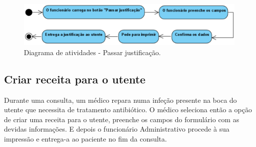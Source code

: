 \documentclass[11pt,a4paper,twoside]{report}
\begin{document}
\begin{figure}[H]
	\centering
	\includegraphics[width=0.7\linewidth]{image/Atividades/Justificação}
	\caption {Diagrama de atividades - Passar justificação.}
	\label{fig:passarjustificacao}
\end{figure}


\subsection{Criar receita para o utente }

Durante uma consulta, um médico repara numa infeção presente na boca do utente que necessita de tratamento antibiótico. O médico seleciona então a opção de criar uma receita para o utente, preenche os campos do formulário com as devidas informações. E depois o  funcionário Administrativo procede à sua impressão e entrega-a ao paciente no fim da consulta. 
\end{document}
